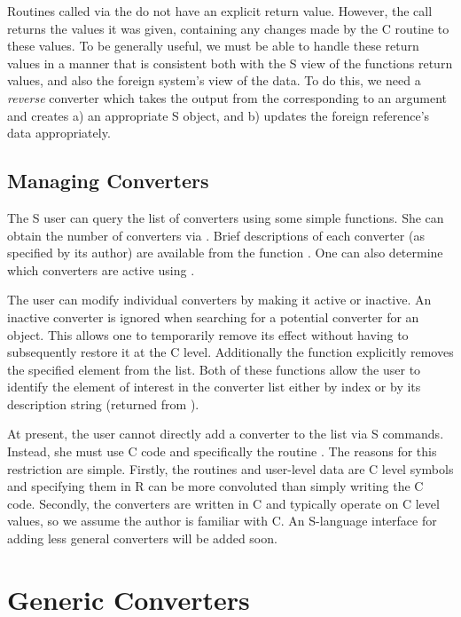 \documentclass{article}
\begin{document}
Routines called via the  do not have an explicit return
value.  However, the  call returns the values it was
given, containing any changes made by the C routine to these values.
To be generally useful, we must be able to handle these return values
in a manner that is consistent both with the S view of the
 functions return values, and also the foreign system's
view of the data.  To do this, we need a \textit{reverse} converter
which takes the output from the  corresponding to an
argument and creates a) an appropriate S object, and b) updates the
foreign reference's data appropriately.


\subsection{Managing Converters}
The S user can query the list of converters using some simple
functions.  She can obtain the number of converters via
.  Brief descriptions of each converter
(as specified by its author) are available from the function
.  One can also determine which
converters are active using . 

 The user can modify individual converters by making it active or
inactive.  An inactive converter is ignored when searching for a
potential converter for an object. This allows one to temporarily
remove its effect without having to subsequently restore it at the C
level.  Additionally the function 
explicitly removes the specified element from the list.  Both of these
functions allow the user to identify the element of interest in the
converter list either by index or by its description string (returned
from ).

At present, the user cannot directly add a converter to the list via S
commands. Instead, she must use C code and specifically the routine
. The reasons for this restriction are
simple. Firstly, the routines and user-level data are C level symbols
and specifying them in R can be more convoluted than simply writing
the C code. Secondly, the converters are written in C and typically
operate on C level values, so we assume the author is familiar with C.
An S-language interface for adding less general converters 
will be added soon.



\section{Generic Converters}
\end{document}
